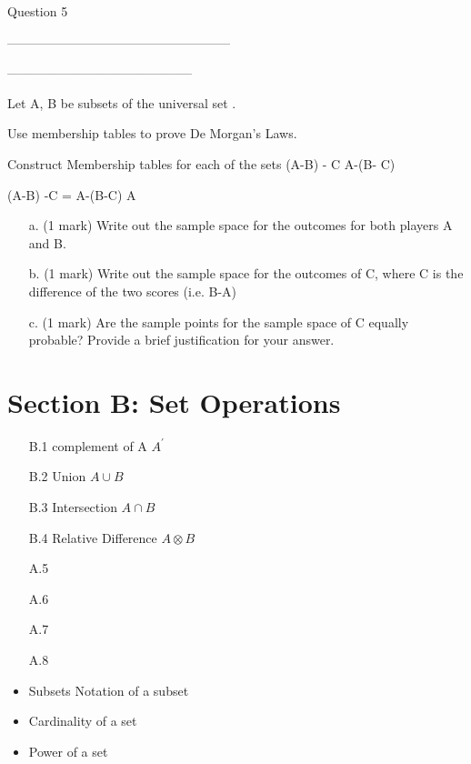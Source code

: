 {{%

Question 5

-----------------------------------------------------


--------------------------------------------

Let A, B be subsets of the universal set .

Use membership tables to prove De Morgan's Laws.



Construct Membership tables for each of the sets
(A-B) - C
A-(B- C)

(A-B) -C = A-(B-C)
A



\begin{itemize}
\item[a.] (1 mark) Write out the sample space for the outcomes for both players A and B.
\item[b.] (1 mark) Write out the sample space for the outcomes of C, where C is the difference of the two scores (i.e. B-A)
\item[c.] (1 mark) Are the sample points for the sample space of C equally probable? Provide a brief justification for your answer.
\end{itemize}

\newpage
\section*{Section B: Set Operations}
\begin{itemize}
\item[B.1] complement of A $A^{\prime}$
\item[B.2] Union $A \cup B$
\item[B.3] Intersection $A \cap B$
\item[B.4] Relative Difference $A \otimes B$
\item[A.5]
\item[A.6]
\item[A.7]
\item[A.8]
\end{itemize}
\newpage



\begin{itemize}
\item Subsets Notation of a subset
\item Cardinality of a set
\item Power of a set
\end{itemize}

}}
